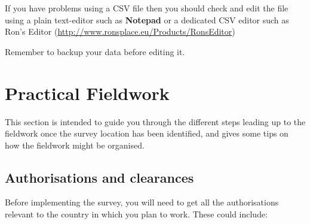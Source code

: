 \documentclass[12pt,a4paper]{book}
\theoremstyle{definition}
\theoremstyle{definition}
\theoremstyle{definition}
\theoremstyle{remark}
\begin{document}
If you have problems using a CSV file then you should check and edit the
file using a plain text-editor such as \textbf{Notepad} or a dedicated
CSV editor such as Ron's Editor
(\url{http://www.ronsplace.eu/Products/RonsEditor})

Remember to backup your data before editing it.

\hypertarget{practical}{%
\chapter{Practical Fieldwork}\label{practical}}

This section is intended to guide you through the different steps
leading up to the fieldwork once the survey location has been
identified, and gives some tips on how the fieldwork might be organised.

\hypertarget{authorisations-and-clearances}{%
\section{Authorisations and
clearances}\label{authorisations-and-clearances}}

Before implementing the survey, you will need to get all the
authorisations relevant to the country in which you plan to work. These
could include:
\end{document}
